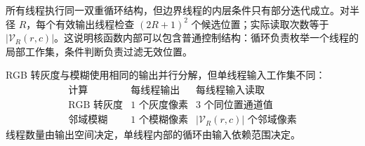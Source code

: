 所有线程执行同一双重循环结构，但边界线程的内层条件只有部分迭代成立。对半径 $R$，每个有效输出线程检查 $(2R+1)^2$ 个候选位置；实际读取次数等于 $\lvert\mathcal{V}_{R}(r,c)\rvert$。这说明核函数内部可以包含普通控制结构：循环负责枚举一个线程的局部工作集，条件判断负责过滤无效位置。

\begin{keybox}
RGB 转灰度与模糊使用相同的输出并行分解，但单线程输入工作集不同：
\[
\begin{array}{c|c|c}
\text{计算} & \text{每线程输出} & \text{每线程输入读取}\\
\hline
\text{RGB 转灰度} & 1\text{ 个灰度像素} & 3\text{ 个同位置通道值}\\
\text{邻域模糊} & 1\text{ 个模糊像素} & \lvert\mathcal{V}_{R}(r,c)\rvert\text{ 个邻域像素}
\end{array}
\]
线程数量由输出空间决定，单线程内部的循环由输入依赖范围决定。
\end{keybox}
